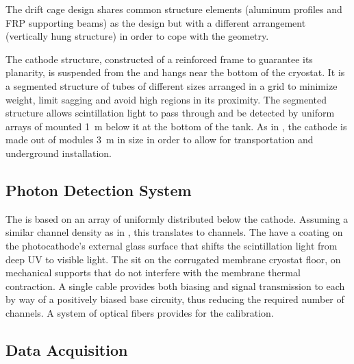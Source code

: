 
The drift cage design shares common structure elements (aluminum profiles and FRP supporting beams) as the \single {} design but with a different arrangement (vertically hung structure) in order to cope with the  geometry.

The cathode structure, constructed of a reinforced frame to guarantee its planarity, is suspended from the  and hangs near the 
bottom of the cryostat. It is a segmented structure of tubes of different sizes  arranged in a grid to minimize weight, limit sagging and avoid high \efield
regions in its proximity.  The segmented structure allows scintillation light to pass through and be detected by uniform arrays of  mounted \SI{1}{m} below it at the bottom of the tank. As in , the cathode is made out of modules \SI{3}{m} in size in order to allow for transportation and underground installation. 

\subsection{Photon Detection System}
\label{v4:fddp-ov:pd}

The  is based on an array of  uniformly distributed below the cathode. Assuming a similar channel density as in , this translates to \dpnumpmtch channels. The  have a  coating on the photocathode's external glass surface that shifts the scintillation light from deep UV to visible light. The   sit on the corrugated membrane cryostat floor, on %
mechanical supports that do not interfere with the membrane thermal contraction. %
A single  cable provides both  biasing and signal transmission to each  by way of a positively biased base circuity, thus reducing the required number of \fdth{} channels.
A system of optical fibers provides for the  calibration.  


\subsection{Data Acquisition}
\label{v4:fddp-ov:daq}

